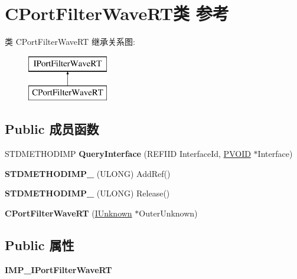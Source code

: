 \hypertarget{class_c_port_filter_wave_r_t}{}\section{C\+Port\+Filter\+Wave\+R\+T类 参考}
\label{class_c_port_filter_wave_r_t}
类 C\+Port\+Filter\+Wave\+RT 继承关系图\+:\begin{figure}[H]
\begin{center}
\leavevmode
\includegraphics[height=2.000000cm]{class_c_port_filter_wave_r_t}
\end{center}
\end{figure}
\subsection*{Public 成员函数}
\begin{DoxyCompactItemize}
\item 
\mbox{\label{class_c_port_filter_wave_r_t_ab5c4ad84ef150593de6aca51412bc2fd}} 
S\+T\+D\+M\+E\+T\+H\+O\+D\+I\+MP {\bfseries Query\+Interface} (R\+E\+F\+I\+ID Interface\+Id, \hyperlink{interfacevoid}{P\+V\+O\+ID} $\ast$Interface)
\item 
\mbox{\label{class_c_port_filter_wave_r_t_a2d836b61af480ffd2217f885d12fea15}} 
{\bfseries S\+T\+D\+M\+E\+T\+H\+O\+D\+I\+M\+P\+\_\+} (U\+L\+O\+NG) Add\+Ref()
\item 
\mbox{\label{class_c_port_filter_wave_r_t_accd93fe139c023a6cfac98ae687463d6}} 
{\bfseries S\+T\+D\+M\+E\+T\+H\+O\+D\+I\+M\+P\+\_\+} (U\+L\+O\+NG) Release()
\item 
\mbox{\label{class_c_port_filter_wave_r_t_a0dfe71e38a66c79de8d5b4b86fe6b4f5}} 
{\bfseries C\+Port\+Filter\+Wave\+RT} (\hyperlink{interface_i_unknown}{I\+Unknown} $\ast$Outer\+Unknown)
\end{DoxyCompactItemize}
\subsection*{Public 属性}
\begin{DoxyCompactItemize}
\item 
\mbox{\label{class_c_port_filter_wave_r_t_acd873cd8413e3e2ea16e0695cf56f14f}} 
{\bfseries I\+M\+P\+\_\+\+I\+Port\+Filter\+Wave\+RT}
\end{DoxyCompactItemize}
